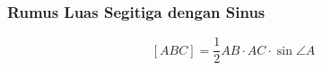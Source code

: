 \subsubsection{Rumus Luas Segitiga dengan Sinus}
$$[ABC]  = \dfrac{1}{2}AB\cdot AC \cdot \sin \angle A$$